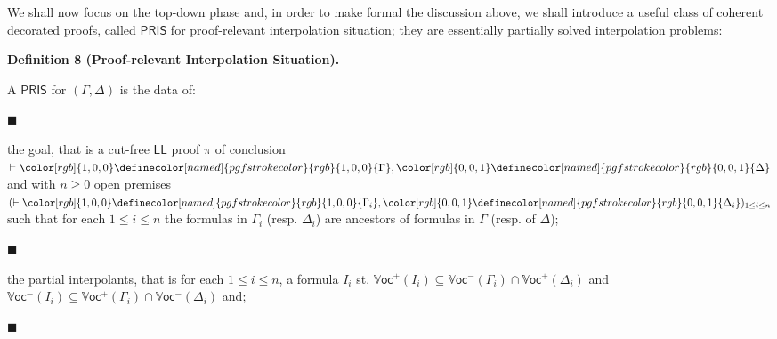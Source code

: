  
We shall now focus on the top-down phase and, in order to make formal the discussion above, we shall introduce a useful class of coherent decorated proofs, called $\mathsf{PRIS}$ for proof-relevant interpolation situation; they are essentially partially solved interpolation problems:\par
 
 
 
\par\medskip\noindent\textbf{Definition 8 (Proof-relevant Interpolation Situation).}\par
 
 
A $\mathsf{PRIS}$ for $(\Gamma,\Delta)$ is the data of:\par
  
\par\noindent  $\blacksquare$ 
 
the goal, that is a cut-free $\mathsf{LL}$ proof $\pi$ of conclusion $\vdash{\color[rgb]{1,0,0}\definecolor[named]{pgfstrokecolor}{rgb}{1,0,0}{{\Gamma}}},{\color[rgb]{0,0,1}\definecolor[named]{pgfstrokecolor}{rgb}{0,0,1}{{\Delta}}}$ and with $n\geq 0$ open premises $(\vdash{\color[rgb]{1,0,0}\definecolor[named]{pgfstrokecolor}{rgb}{1,0,0}{{\Gamma_{i}}}},{\color[rgb]{0,0,1}\definecolor[named]{pgfstrokecolor}{rgb}{0,0,1}{{\Delta_{i}}}})_{1\leq i\leq n}$ such that for each $1\leq i\leq n$ the formulas in $\Gamma_{i}$ (resp. $\Delta_{i}$) are ancestors of formulas in $\Gamma$ (resp. of $\Delta$);\par
 
 
 
\par\noindent  $\blacksquare$ 
 
the partial interpolants, that is for each $1\leq i\leq n$, a formula $I_{i}$ st. $\mathbb{V}\mathsf{oc}^{+}{(I_{i})}\subseteq\mathbb{V}\mathsf{oc}^{-}{(\Gamma_{i})}\cap\mathbb{V}\mathsf{oc}^{+}{(\Delta_{i})}$ and $\mathbb{V}\mathsf{oc}^{-}{(I_{i})}\subseteq\mathbb{V}\mathsf{oc}^{+}{(\Gamma_{i})}\cap\mathbb{V}\mathsf{oc}^{-}{(\Delta_{i})}$ and;\par
 
 
 
\par\noindent  $\blacksquare$ 
 
